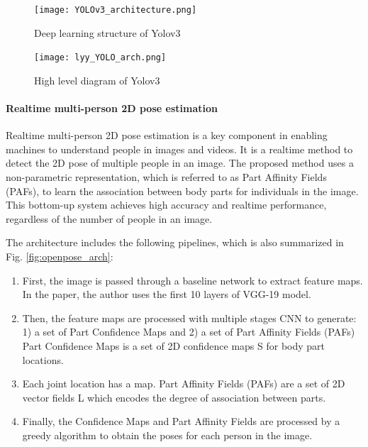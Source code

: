     \begin{figure}[h!]
        \centering \texttt{[image: YOLOv3\_architecture.png]}
        \caption{Deep learning structure of Yolov3}
        \label{fig:yolov3}
    \end{figure}
    
    
    \begin{figure}[h!]
        \centering \texttt{[image: lyy\_YOLO\_arch.png]}
        \caption{High level diagram of Yolov3}
        \label{fig:yolov3_arch}
    \end{figure}

\paragraph{Realtime multi-person 2D pose estimation} Realtime multi-person 2D pose estimation is a key component in enabling machines to understand people in images and videos. It is a realtime method to detect the 2D pose of multiple people in an image. The proposed method uses a non-parametric representation, which is referred to as Part Affinity Fields (PAFs), to learn the association between body parts for individuals in the image. This bottom-up system achieves high accuracy and realtime performance, regardless of the number of people in an image. \cite{zhu2013pedestrian}
    
The architecture includes the following pipelines, which is also summarized in Fig. \ref{fig:openpose_arch}:

\begin{enumerate}
    \item First, the image is passed through a baseline network to extract feature maps. In the paper, the author uses the first 10 layers of VGG-19 model.
    \item Then, the feature maps are processed with multiple stages CNN to generate: 1) a set of Part Confidence Maps and 2) a set of Part Affinity Fields (PAFs) Part Confidence Maps is a set of 2D confidence maps S for body part locations. 
    \item Each joint location has a map. Part Affinity Fields (PAFs) are a set of 2D vector fields L which encodes the degree of association between parts.
    \item Finally, the Confidence Maps and Part Affinity Fields are processed by a greedy algorithm to obtain the poses for each person in the image.

\end{enumerate}

